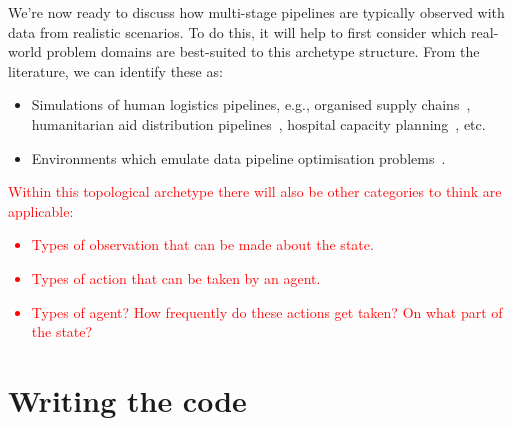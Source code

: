 We're now ready to discuss how multi-stage pipelines are typically observed with data from realistic scenarios. To do this, it will help to first consider which real-world problem domains are best-suited to this archetype structure. From the literature, we can identify these as:
\begin{itemize}
\item{Simulations of human logistics pipelines, e.g., organised supply chains~\cite{yan2022reinforcement}, humanitarian aid distribution pipelines~\cite{yu2021reinforcement}, hospital capacity planning~\cite{shuvo2021deep}, etc. }
\item{Environments which emulate data pipeline optimisation problems~\cite{nagrecha2023intune}.}
\end{itemize}

\textcolor{red}{Within this topological archetype there will also be other categories to think are applicable:
\begin{itemize}
\item{Types of observation that can be made about the state.}
\item{Types of action that can be taken by an agent.}
\item{Types of agent? How frequently do these actions get taken? On what part of the state?}
\end{itemize}
}

\section{\sffamily Writing the code}